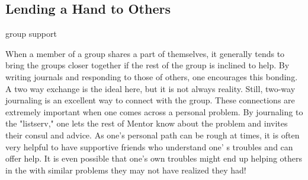 \subsection{Lending a Hand to Others}

group support

When a member of a group shares a part of themselves, it generally
tends to bring the groups closer together if the rest of the group is
inclined to help. By writing journals and responding to those of
others, one encourages this bonding. A two way exchange is the ideal
here, but it is not always reality. Still, two-way journaling is an
excellent way to connect with the group. These connections are
extremely important when one comes across a personal problem. By
journaling to the "listserv," one lets the rest of Mentor know about
the problem and invites their consul and advice. As one's personal
path can be rough at times, it is often very helpful to have
supportive friends who understand one' s troubles and can offer help.
It is even possible that one's own troubles might end up helping
others in the with similar problems they may not have realized they
had!

